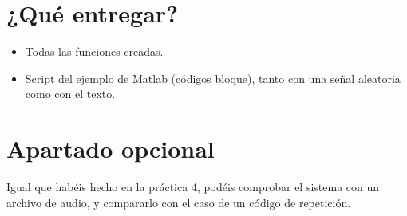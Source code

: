 \documentclass[es,practica,12pt]{uah}
\begin{document}
\section{¿Qué entregar?}
\begin{itemize}
	\item Todas las funciones creadas.
	\item Script del ejemplo de Matlab (códigos bloque), tanto con una señal aleatoria como con el texto.
\end{itemize}

\section{Apartado opcional}

Igual que habéis hecho en la práctica 4, podéis comprobar el sistema con un archivo de audio, y compararlo con el caso de un código de repetición. 

\end{document}
